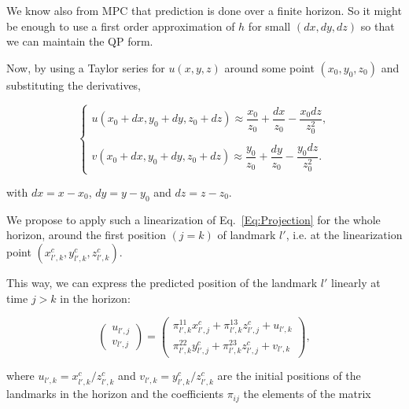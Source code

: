 We know also from MPC that prediction is done over a finite horizon. So it might be enough to use a first order approximation of $h$ for small $(dx,dy,dz)$ so that we can maintain the QP form.

Now, by using a Taylor series for $u(x,y,z)$ around some point $(x_0,y_0,z_0)$ and substituting the derivatives,


$$
\left\{
\begin{array}{c}
\nonumber
 u(x_0+dx,y_0+dy,z_0+dz) \approx \dfrac{x_0}{z_0} +  \dfrac{dx}{z_0} - \dfrac{x_0 dz}{z_0^2},\\ \\
 v(x_0+dx,y_0+dy,z_0+dz) \approx \dfrac{y_0}{z_0} +  \dfrac{dy}{z_0} - \dfrac{y_0 dz}{z_0^2}.
\end{array}
\right.
$$

with $dx=x-x_0$, $dy=y-y_0$ and $dz=z-z_0$. 

We propose to apply such a linearization of Eq.~\ref{Eq:Projection} for the whole horizon, around the first position $(j=k)$ of landmark $l'$, i.e. at the linearization point $(x^{c}_{l',k},y^{c}_{l',k},z^{c}_{l',k})$. 

This way, we can express the predicted position of the landmark $l'$ linearly at time $j>k$ in the horizon:

\begin{equation*}
 \left(
 \begin{matrix}
  u_{l',j} \\
  v_{l',j}
 \end{matrix}
 \right)
 = \left(
 \begin{matrix}
  \pi^{11}_{l',k} x^{c}_{l',j} + \pi^{13}_{l',k} z^{c}_{l',j}+ u_{l',k}\\
  \pi^{22}_{l',k} y^{c}_{l',j} + \pi^{23}_{l',k} z^{c}_{l',j} + v_{l',k}
 \end{matrix}
 \right),
\end{equation*}

where $u_{l',k} = x^{c}_{l',k} / z^{c}_{l',k}$ and $v_{l',k} = y^{c}_{l',k} / z^{c}_{l',k}$ are the initial positions of the landmarks in the horizon and the coefficients $\pi_{ij}$ the elements of the matrix

